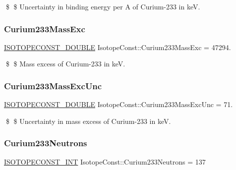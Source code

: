 \$ \$ Uncertainty in binding energy per A of Curium-\/233 in keV. \mbox{\label{group___isotope_const-_curium-_cm233_ga6e2e16de229fbfa22b0a8568c1115daf}} 
\subsubsection{\texorpdfstring{Curium233\+Mass\+Exc}{Curium233MassExc}}
{\footnotesize\ttfamily \mbox{\hyperlink{group___isotope_const-_macros_ga8f45a7272ce02c0b4c65c44636ed719a}{I\+S\+O\+T\+O\+P\+E\+C\+O\+N\+S\+T\+\_\+\+D\+O\+U\+B\+LE}} Isotope\+Const\+::\+Curium233\+Mass\+Exc = 47294.}

\$ \$ Mass excess of Curium-\/233 in keV. \mbox{\label{group___isotope_const-_curium-_cm233_ga32cb51c9f6caf2288ff489016aeae8d7}} 
\subsubsection{\texorpdfstring{Curium233\+Mass\+Exc\+Unc}{Curium233MassExcUnc}}
{\footnotesize\ttfamily \mbox{\hyperlink{group___isotope_const-_macros_ga8f45a7272ce02c0b4c65c44636ed719a}{I\+S\+O\+T\+O\+P\+E\+C\+O\+N\+S\+T\+\_\+\+D\+O\+U\+B\+LE}} Isotope\+Const\+::\+Curium233\+Mass\+Exc\+Unc = 71.}

\$ \$ Uncertainty in mass excess of Curium-\/233 in keV. \mbox{\label{group___isotope_const-_curium-_cm233_ga299a20093708f3a0f8e8a275eead65e9}} 
\subsubsection{\texorpdfstring{Curium233\+Neutrons}{Curium233Neutrons}}
{\footnotesize\ttfamily \mbox{\hyperlink{group___isotope_const-_macros_ga5f18360b3e99483a35c32d789e62621c}{I\+S\+O\+T\+O\+P\+E\+C\+O\+N\+S\+T\+\_\+\+I\+NT}} Isotope\+Const\+::\+Curium233\+Neutrons = 137}

